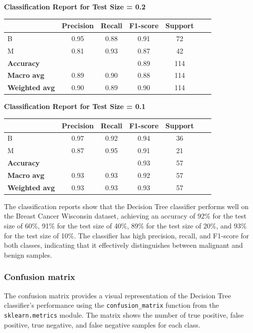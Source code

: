 \vspace{2em}

\textbf{Classification Report for Test Size = 0.2}

\begin{tabular}{lcccccc}
\hline
 & \textbf{Precision} & \textbf{Recall} & \textbf{F1-score} & \textbf{Support} \\
\hline
B & 0.95 & 0.88 & 0.91 & 72 \\
M & 0.81 & 0.93 & 0.87 & 42 \\
\hline
\textbf{Accuracy} & & & 0.89 & 114 \\
\textbf{Macro avg} & 0.89 & 0.90 & 0.88 & 114 \\
\textbf{Weighted avg} & 0.90 & 0.89 & 0.90 & 114 \\
\hline
\end{tabular}

\vspace{100em}

\textbf{Classification Report for Test Size = 0.1}

\begin{tabular}{lcccccc}
\hline
 & \textbf{Precision} & \textbf{Recall} & \textbf{F1-score} & \textbf{Support} \\
\hline
B & 0.97 & 0.92 & 0.94 & 36 \\
M & 0.87 & 0.95 & 0.91 & 21 \\
\hline
\textbf{Accuracy} & & & 0.93 & 57 \\
\textbf{Macro avg} & 0.93 & 0.93 & 0.92 & 57 \\
\textbf{Weighted avg} & 0.93 & 0.93 & 0.93 & 57 \\
\hline
\end{tabular}

The classification reports show that the Decision Tree classifier performs well on the Breast Cancer Wisconsin dataset, achieving an accuracy of 92\% for the test size of 60\%, 91\% for the test size of 40\%, 89\% for the test size of 20\%, and 93\% for the test size of 10\%. The classifier has high precision, recall, and F1-score for both classes, indicating that it effectively distinguishes between malignant and benign samples.

\subsubsection{Confusion matrix}

The confusion matrix provides a visual representation of the Decision Tree classifier's performance using the \texttt{confusion\_matrix} function from the \texttt{sklearn.metrics} module. The matrix shows the number of true positive, false positive, true negative, and false negative samples for each class.

